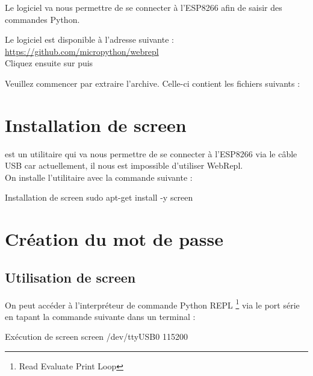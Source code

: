 Le logiciel  va nous permettre de se connecter à l'ESP8266 afin de saisir des commandes Python.

Le logiciel est disponible à l'adresse suivante : \\

\url{https://github.com/micropython/webrepl}\\

Cliquez ensuite sur  puis 


Veuillez commencer par extraire l'archive.
Celle-ci contient les fichiers suivants : 


\section{Installation de screen}

 est un utilitaire qui va nous permettre de se connecter à l'ESP8266 via le câble USB car actuellement, il nous est impossible d'utiliser WebRepl.\\
On installe l'utilitaire avec la commande suivante : 
\begin{Bash}{Installation de screen}
sudo apt-get install -y screen
\end{Bash}

\section{Création du mot de passe}

\subsection{Utilisation de screen}

On peut accéder à l’interpréteur de commande Python REPL \footnote{Read Evaluate Print Loop} via le port série en tapant la commande suivante dans un terminal :

\begin{Bash}{Exécution de screen}
screen /dev/ttyUSB0 115200
\end{Bash}





